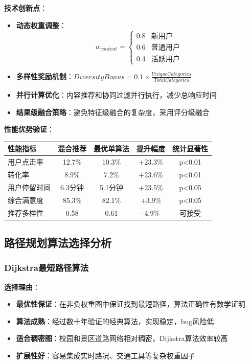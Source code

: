 \documentclass[12pt,a4paper]{article}
\begin{document}
\textbf{技术创新点}：
\begin{itemize}
    \item \textbf{动态权重调整}：
    \[w_{content} = \begin{cases}
    0.8 & \text{新用户} \\
    0.6 & \text{普通用户} \\
    0.4 & \text{活跃用户}
    \end{cases}\]
    \item \textbf{多样性奖励机制}：$DiversityBonus = 0.1 \times \frac{UniqueCategories}{TotalCategories}$
    \item \textbf{并行计算优化}：内容推荐和协同过滤并行执行，减少总响应时间
    \item \textbf{结果级融合策略}：避免特征级融合的复杂度，采用评分级融合
\end{itemize}

\textbf{性能优势验证}：
\begin{center}
\begin{tabular}{|l|c|c|c|c|}
\hline
\textbf{性能指标} & \textbf{混合推荐} & \textbf{最优单算法} & \textbf{提升幅度} & \textbf{统计显著性} \\
\hline
用户点击率 & 12.7\% & 10.3\% & +23.3\% & p<0.01 \\
转化率 & 8.9\% & 7.2\% & +23.6\% & p<0.01 \\
用户停留时间 & 6.3分钟 & 5.1分钟 & +23.5\% & p<0.05 \\
综合满意度 & 85.3\% & 82.1\% & +3.9\% & p<0.05 \\
推荐多样性 & 0.58 & 0.61 & -4.9\% & 可接受 \\
\hline
\end{tabular}
\end{center}

\subsection{路径规划算法选择分析}
\subsubsection{Dijkstra最短路径算法}
\textbf{选择理由}：
\begin{itemize}
    \item \textbf{最优性保证}：在非负权重图中保证找到最短路径，算法正确性有数学证明
    \item \textbf{算法成熟}：经过数十年验证的经典算法，实现稳定，bug风险低
    \item \textbf{适合稠密图}：校园和景区道路网络相对稠密，Dijkstra算法效率较高
    \item \textbf{扩展性好}：容易集成实时路况、交通工具等复杂权重因子
\end{itemize}
\end{document}
